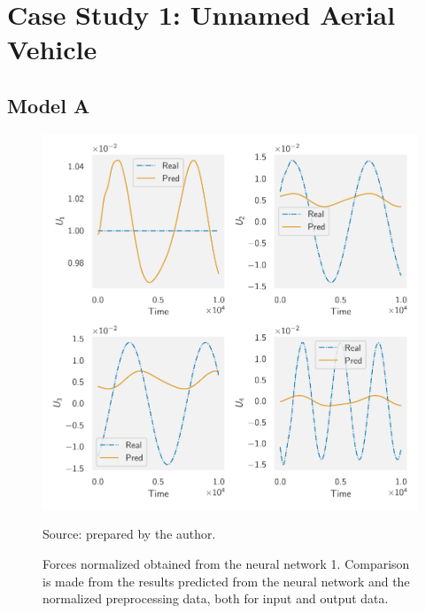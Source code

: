 \section{Case Study 1: Unnamed Aerial Vehicle}

\subsection{Model A}

\begin{figure}[!htb]
    \centering
    \caption[Forces normalized obtained from the neural network 1]{Forces normalized obtained from the neural network 1. Comparison is made from the results predicted from the neural network and the normalized preprocessing data, both for input and output data.}
    \includegraphics{figures/4results/uav/forces_normalized.pdf}

    {\footnotesize Source: prepared by the author.}
    \label{fig:forces_normalized}
\end{figure}

